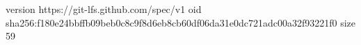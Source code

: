 version https://git-lfs.github.com/spec/v1
oid sha256:f180e24bbffb09beb0c8c9f8d6eb8cb60df06da31e0dc721adc00a32f93221f0
size 59
